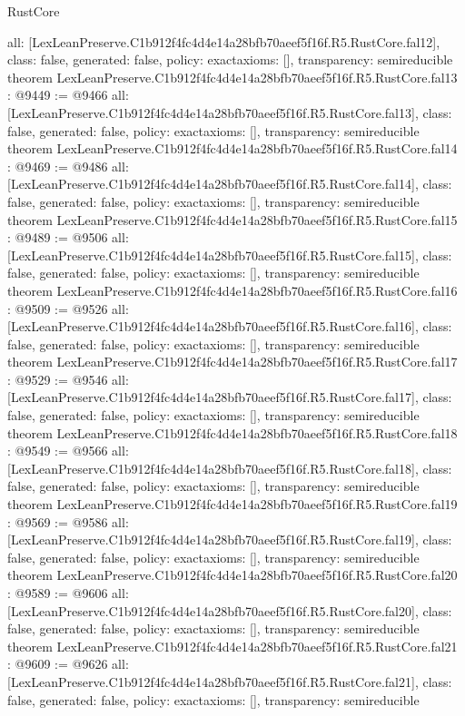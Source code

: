 \begin{lexlean}{RustCore}
\begin{coremodule}
{  all: [LexLeanPreserve.C1b912f4fc4d4e14a28bfb70aeef5f16f.R5.RustCore.fal12],
  class: false,
  generated: false,
  policy: exact{axioms: []},
  transparency: semireducible
}
theorem LexLeanPreserve.C1b912f4fc4d4e14a28bfb70aeef5f16f.R5.RustCore.fal13 : @9449 := @9466 {
  all: [LexLeanPreserve.C1b912f4fc4d4e14a28bfb70aeef5f16f.R5.RustCore.fal13],
  class: false,
  generated: false,
  policy: exact{axioms: []},
  transparency: semireducible
}
theorem LexLeanPreserve.C1b912f4fc4d4e14a28bfb70aeef5f16f.R5.RustCore.fal14 : @9469 := @9486 {
  all: [LexLeanPreserve.C1b912f4fc4d4e14a28bfb70aeef5f16f.R5.RustCore.fal14],
  class: false,
  generated: false,
  policy: exact{axioms: []},
  transparency: semireducible
}
theorem LexLeanPreserve.C1b912f4fc4d4e14a28bfb70aeef5f16f.R5.RustCore.fal15 : @9489 := @9506 {
  all: [LexLeanPreserve.C1b912f4fc4d4e14a28bfb70aeef5f16f.R5.RustCore.fal15],
  class: false,
  generated: false,
  policy: exact{axioms: []},
  transparency: semireducible
}
theorem LexLeanPreserve.C1b912f4fc4d4e14a28bfb70aeef5f16f.R5.RustCore.fal16 : @9509 := @9526 {
  all: [LexLeanPreserve.C1b912f4fc4d4e14a28bfb70aeef5f16f.R5.RustCore.fal16],
  class: false,
  generated: false,
  policy: exact{axioms: []},
  transparency: semireducible
}
theorem LexLeanPreserve.C1b912f4fc4d4e14a28bfb70aeef5f16f.R5.RustCore.fal17 : @9529 := @9546 {
  all: [LexLeanPreserve.C1b912f4fc4d4e14a28bfb70aeef5f16f.R5.RustCore.fal17],
  class: false,
  generated: false,
  policy: exact{axioms: []},
  transparency: semireducible
}
theorem LexLeanPreserve.C1b912f4fc4d4e14a28bfb70aeef5f16f.R5.RustCore.fal18 : @9549 := @9566 {
  all: [LexLeanPreserve.C1b912f4fc4d4e14a28bfb70aeef5f16f.R5.RustCore.fal18],
  class: false,
  generated: false,
  policy: exact{axioms: []},
  transparency: semireducible
}
theorem LexLeanPreserve.C1b912f4fc4d4e14a28bfb70aeef5f16f.R5.RustCore.fal19 : @9569 := @9586 {
  all: [LexLeanPreserve.C1b912f4fc4d4e14a28bfb70aeef5f16f.R5.RustCore.fal19],
  class: false,
  generated: false,
  policy: exact{axioms: []},
  transparency: semireducible
}
theorem LexLeanPreserve.C1b912f4fc4d4e14a28bfb70aeef5f16f.R5.RustCore.fal20 : @9589 := @9606 {
  all: [LexLeanPreserve.C1b912f4fc4d4e14a28bfb70aeef5f16f.R5.RustCore.fal20],
  class: false,
  generated: false,
  policy: exact{axioms: []},
  transparency: semireducible
}
theorem LexLeanPreserve.C1b912f4fc4d4e14a28bfb70aeef5f16f.R5.RustCore.fal21 : @9609 := @9626 {
  all: [LexLeanPreserve.C1b912f4fc4d4e14a28bfb70aeef5f16f.R5.RustCore.fal21],
  class: false,
  generated: false,
  policy: exact{axioms: []},
  transparency: semireducible
}
\end{coremodule}
\end{lexlean}
